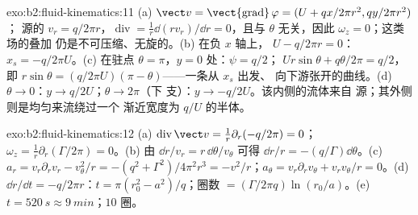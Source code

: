 \begin{solution}{exo:b2:fluid-kinematics:11}
(a) $\vect v = \operatorname{\vect{grad}}\varphi = (U + qx/2\pi r^2, qy/2\pi r^2)$；
源的 $v_r = q/2\pi r$，$\operatorname{div} = \frac1r\dd(rv_r)/\dd r
= 0$，且与 $\theta$ 无关，因此 $\omega_z = 0$；这类场的叠加
仍是不可压缩、无旋的。(b) 在负 $x$ 轴上，
$U - q/2\pi r = 0$：$x_s = -q/2\pi U$。(c) 在驻点 $\theta =
\pi$，$y = 0$ 处：$\psi = q/2$； $Ur\sin\theta + q\theta/2\pi = q/2$，
即 $r\sin\theta = (q/2\pi U)(\pi - \theta)$——一条从 $x_s$ 出发、
向下游张开的曲线。(d) $\theta \to 0$：$y \to q/2U$；$\theta \to 2\pi$（下
支）：$y \to -q/2U$。该内侧的流体来自
源；其外侧则是均匀来流绕过一个
渐近宽度为 $q/U$ 的半体。
\end{solution}

\begin{solution}{exo:b2:fluid-kinematics:12}
(a) $\operatorname{div}\vect v = \frac1r\partial_r(-q/2\pi) = 0$；$\omega_z =
\frac1r\partial_r(\Gamma/2\pi) = 0$。(b) 由 $\dd r/v_r = r\,\dd\theta/v_\theta$ 可得
$\dd r/r = -(q/\Gamma)\dd\theta$。(c) $a_r = v_r\partial_rv_r - v_\theta^2/r =
-(q^2 + \Gamma^2)/4\pi^2r^3 = -v^2/r$；$a_\theta = v_r\partial_rv_\theta + v_rv_\theta/r
= 0$。(d) $\dd r/\dd t = -q/2\pi r$：$t = \pi(r_0^2 - a^2)/q$；圈数
$= (\Gamma/2\pi q)\ln(r_0/a)$。(e) $t = \qty{520}{s} \approx \qty{9}{min}$；$10$
圈。
\end{solution}

